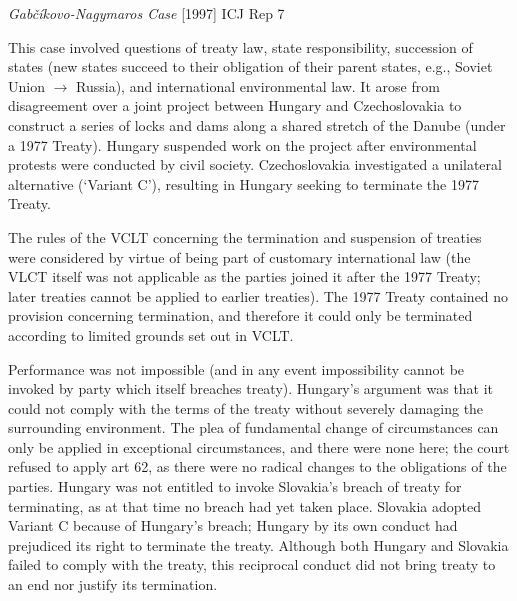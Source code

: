 \begin{casedetails}{\textit{Gabčíkovo-Nagymaros Case} [1997] ICJ Rep 7}\label{case:[1997] ICJ Rep 7}
    \flushleft

    This case involved questions of treaty law, state responsibility, succession of states (new states succeed to their obligation of their parent states, e.g., Soviet Union $\rightarrow$ Russia), and international environmental law. It arose from disagreement over a joint project between Hungary and Czechoslovakia to construct a series of locks and dams along a shared stretch of the Danube (under a 1977 Treaty). Hungary suspended work on the project after environmental protests were conducted by civil society. Czechoslovakia investigated a unilateral alternative (`Variant C'), resulting in Hungary seeking to terminate the 1977 Treaty.

    \vspace{\baselineskip}
    
    The rules of the VCLT concerning the termination and suspension of treaties were considered by virtue of being part of customary international law (the VLCT itself was not applicable as the parties joined it after the 1977 Treaty; later treaties cannot be applied to earlier treaties). The 1977 Treaty contained no provision concerning termination, and therefore it could only be terminated according to limited grounds set out in VCLT. 
    
    \vspace{\baselineskip}
    
    Performance was not impossible (and in any event impossibility cannot be invoked by party which itself breaches treaty). Hungary's argument was that it could not comply with the terms of the treaty without severely damaging the surrounding environment. The plea of fundamental change of circumstances can only be applied in exceptional circumstances, and there were none here; the court refused to apply art 62, as there were no radical changes to the obligations of the parties. Hungary was not entitled to invoke Slovakia's breach of treaty for terminating, as at that time no breach had yet taken place. Slovakia adopted Variant C because of Hungary's breach; Hungary by its own conduct had prejudiced its right to terminate the treaty. Although both Hungary and Slovakia failed to comply with the treaty, this reciprocal conduct did not bring treaty to an end nor justify its termination.

    \vspace{\baselineskip}


\end{casedetails}
